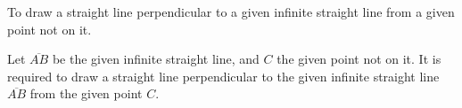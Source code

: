 \renewcommand\qedsymbol{Q.E.F}

\begin{con}
To draw a straight line perpendicular to a given infinite straight line from a given point not on it.
\end{con}

Let $\overline{AB}$ be the given infinite straight line, and $C$ the given point not on it. It is required to draw a straight line perpendicular to the given infinite straight line $\overline{AB}$ from the given point $C$.

\begin{figure}[H]
\centering
	\caption{}
\end{figure}

